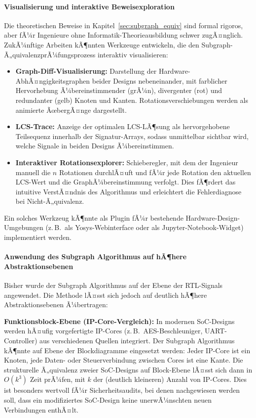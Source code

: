 ﻿\documentclass[12pt,a4paper]{report}
\begin{document}
\paragraph{Visualisierung und interaktive Beweisexploration}

Die theoretischen Beweise in Kapitel~\ref{sec:subgraph_equiv} sind formal rigoros,
aber fÃ¼r Ingenieure ohne Informatik-Theorieausbildung schwer zugÃ¤nglich. ZukÃ¼nftige
Arbeiten kÃ¶nnten Werkzeuge entwickeln, die den Subgraph-Ã„quivalenzprÃ¼fungsprozess
interaktiv visualisieren:

\begin{itemize}
    \item \textbf{Graph-Diff-Visualisierung:} Darstellung der Hardware-AbhÃ¤ngigkeitsgraphen
          beider Designs nebeneinander, mit farblicher Hervorhebung Ã¼bereinstimmender
          (grÃ¼n), divergenter (rot) und redundanter (gelb) Knoten und Kanten.
          Rotationsverschiebungen werden als animierte ÃœbergÃ¤nge dargestellt.
    \item \textbf{LCS-Trace:} Anzeige der optimalen LCS-LÃ¶sung als hervorgehobene
          Teilsequenz innerhalb der Signatur-Arrays, sodass unmittelbar sichtbar wird,
          welche Signale in beiden Designs Ã¼bereinstimmen.
    \item \textbf{Interaktiver Rotationsexplorer:} Schieberegler, mit dem der Ingenieur
          manuell die $n$ Rotationen durchlÃ¤uft und fÃ¼r jede Rotation den aktuellen
          LCS-Wert und die GraphÃ¼bereinstimmung verfolgt. Dies fÃ¶rdert das intuitive
          VerstÃ¤ndnis des Algorithmus und erleichtert die Fehlerdiagnose bei
          Nicht-Ã„quivalenz.
\end{itemize}

Ein solches Werkzeug kÃ¶nnte als Plugin fÃ¼r bestehende Hardware-Design-Umgebungen
(z.\,B.\ als Yosys-Webinterface oder als Jupyter-Notebook-Widget) implementiert werden.

\paragraph{Anwendung des Subgraph Algorithmus auf hÃ¶here Abstraktionsebenen}

Bisher wurde der Subgraph Algorithmus auf der Ebene der RTL-Signals angewendet.
Die Methode lÃ¤sst sich jedoch auf deutlich hÃ¶here Abstraktionsebenen Ã¼bertragen:

\textbf{Funktionsblock-Ebene (IP-Core-Vergleich):} In modernen SoC-Designs werden
hÃ¤ufig vorgefertigte IP-Cores (z.\,B.\ AES-Beschleuniger, UART-Controller) aus
verschiedenen Quellen integriert. Der Subgraph Algorithmus kÃ¶nnte auf Ebene der
Blockdiagramme eingesetzt werden: Jeder IP-Core ist ein Knoten, jede Daten- oder
Steuerverbindung zwischen Cores ist eine Kante. Die strukturelle Ã„quivalenz zweier
SoC-Designs auf Block-Ebene lÃ¤sst sich dann in $O(k^3)$ Zeit prÃ¼fen, mit $k$ der
(deutlich kleineren) Anzahl von IP-Cores. Dies ist besonders wertvoll fÃ¼r
Sicherheitsaudits, bei denen nachgewiesen werden soll, dass ein modifiziertes SoC-Design
keine unerwÃ¼nschten neuen Verbindungen enthÃ¤lt.
\end{document}
